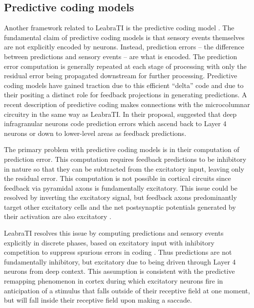 \documentclass[dwyatte_dissertation.tex]{subfiles}
\begin{document}
\subsection{Predictive coding models}
Another framework related to LeabraTI is the predictive coding model \cite[e.g.,]{RaoBallard99,Friston05,DenOudenKokDeLange12}. The fundamental claim of predictive coding models is that sensory events themselves are not explicitly encoded by neurons. Instead, prediction errors -- the difference between predictions and sensory events -- are what is encoded. The prediction error computation is generally repeated at each stage of processing with only the residual error being propagated downstream for further processing. Predictive coding models have gained traction due to this efficient ``delta'' code and due to their positing a distinct role for feedback projections in generating predictions. A recent description of predictive coding makes connections with the microcolumnar circuitry in the same way as LeabraTI. In their proposal,  suggested that deep infragranular neurons code prediction errors which ascend back to Layer 4 neurons or down to lower-level areas as feedback predictions. 

The primary problem with predictive coding models is in their computation of prediction error. This computation requires feedback predictions to be inhibitory in nature so that they can be subtracted from the excitatory input, leaving only the residual error. This computation is not possible in cortical circuits since feedback via pyramidal axons is fundamentally excitatory. This issue could be resolved by inverting the excitatory signal, but feedback axons predominantly target other excitatory cells and the net postsynaptic potentials generated by their activation are also excitatory \cite{Budd98,JohnsonBurkhalter96,JohnsonBurkhalter97}.

LeabraTI resolves this issue by computing predictions and sensory events explicitly in discrete phases, based on excitatory input with inhibitory competition to suppress spurious errors in coding \cite{WyatteHerdMingusEtAl12,DesimoneDuncan95}. Thus predictions are not fundamentally inhibitory, but excitatory due to being driven through Layer 4 neurons from deep context. This assumption is consistent with the predictive remapping phenomenon in cortex \cite{DuhamelColbyGoldberg92,NakamuraColby02,CavanaughHuntAfrazEtAl10} during which excitatory neurons fire in anticipation of a stimulus that falls outside of their receptive field at one moment, but will fall inside their receptive field upon making a saccade.
\end{document}
